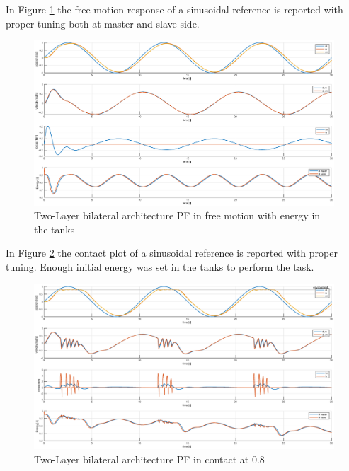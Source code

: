 \documentclass[a4paper,12pt]{article}
\begin{document}
\bigskip
In Figure \ref{fig:energy_pf_free} the free motion response of a sinusoidal reference is reported with proper tuning both at master and slave side.

\begin{figure}[H]
    \begin{center}
        \hspace*{-4.5cm}
        \includegraphics[scale=0.5]{images/energy_pf_free.eps}
    \end{center}
    \caption{Two-Layer bilateral architecture PF in free motion with energy in the tanks}
    \label{fig:energy_pf_free}
\end{figure}

\newpage
In Figure \ref{fig:energy_pf_contact} the contact plot of a sinusoidal reference is reported with proper tuning. Enough initial energy was set in the tanks to perform the task.

\begin{figure}[H]
    \begin{center}
        \hspace*{-4.5cm}
        \includegraphics[scale=0.5]{images/energy_pf_contact.eps}
    \end{center}
    \caption{Two-Layer bilateral architecture PF in contact at 0.8}
    \label{fig:energy_pf_contact}
\end{figure}
\end{document}
